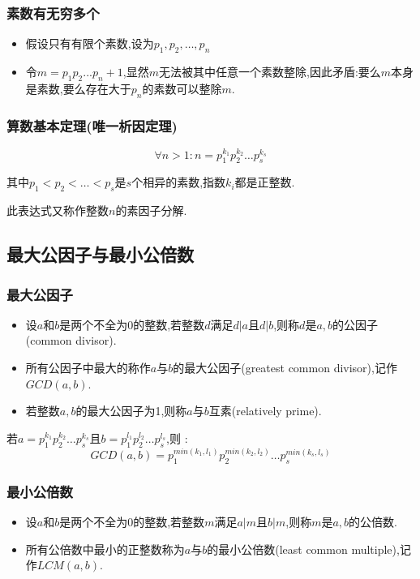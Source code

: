 {{{\subsubsection{素数有无穷多个}{
    \begin{itemize}
        \item 假设只有有限个素数,设为$p_1, p_2, \dots, p_n$
        \item 令$m = p_1p_2...p_n + 1$,显然$m$无法被其中任意一个素数整除,因此矛盾:要么$m$本身是素数,要么存在大于$p_n$的素数可以整除$m$.
    \end{itemize}
}%

\subsubsection{算数基本定理(唯一析因定理)}{
$$
\forall n > 1 : n = p_1^{k_1}p_2^{k_2} \dots p_s^{k_s}
$$

其中$p_1 < p_2 < \dots < p_s$是$s$个相异的素数,指数$k_i$都是正整数.

此表达式又称作整数$n$的素因子分解.
}%

}%

\subsection{最大公因子与最小公倍数}{

    \subsubsection{最大公因子}{
        \begin{itemize}
            \item 设$a$和$b$是两个不全为0的整数,若整数$d$满足$d | a$且$d | b$,则称$d$是$a,b$的公因子(common divisor).
            \item 所有公因子中最大的称作$a$与$b$的最大公因子(greatest common divisor),记作$GCD(a,b)$.
            \item 若整数$a,b$的最大公因子为1,则称$a$与$b$互素(relatively prime).
        \end{itemize}

        若$a = p_1^{k_1}p_2^{k_2} \dots p_s^{k_s}$且$b = p_1^{l_1}p_2^{l_2} \dots p_s^{l_s}$,则 : $$
        GCD(a,b) = p_1^{min(k_1,l_1)}p_2^{min(k_2,l_2)} \dots p_s^{min(k_s,l_s)}
        $$
    }%

    \subsubsection{最小公倍数}{
        \begin{itemize}
            \item 设$a$和$b$是两个不全为0的整数,若整数$m$满足$a | m$且$b | m$,则称$m$是$a,b$的公倍数.
            \item 所有公倍数中最小的正整数称为$a$与$b$的最小公倍数(least common multiple),记作$LCM(a,b)$.
        \end{itemize}

}}}}
